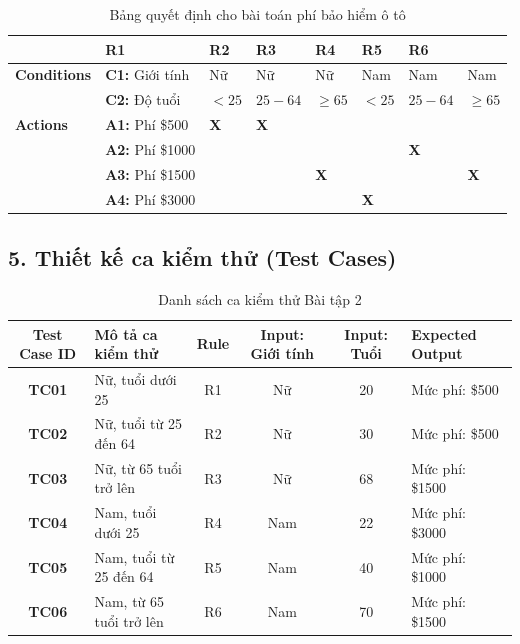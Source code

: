 \documentclass[11pt,a4paper]{article}
\begin{document}
\begin{table}[H]
\centering
\renewcommand{\arraystretch}{1.2}
\begin{tabularx}{\textwidth}{|l|l|Y|Y|Y|Y|Y|Y|}
\hline
{}
 & \textbf{R1} & \textbf{R2} & \textbf{R3} & \textbf{R4} & \textbf{R5} & \textbf{R6} \\ \hline
\textbf{Conditions} & \textbf{C1:} Giới tính & Nữ & Nữ & Nữ & Nam & Nam & Nam \\ 
 & \textbf{C2:} Độ tuổi & $< 25$ & $25 - 64$ & $\ge 65$ & $< 25$ & $25 - 64$ & $\ge 65$ \\ \hline
\textbf{Actions} & \textbf{A1:} Phí \$500 & \textbf{X} & \textbf{X} & & & & \\ 
 & \textbf{A2:} Phí \$1000 & & & & & \textbf{X} & \\ 
 & \textbf{A3:} Phí \$1500 & & & \textbf{X} & & & \textbf{X} \\ 
 & \textbf{A4:} Phí \$3000 & & & & \textbf{X} & & \\ \hline
\end{tabularx}
\caption*{Bảng quyết định cho bài toán phí bảo hiểm ô tô}
\end{table}

\subsection*{5. Thiết kế ca kiểm thử (Test Cases)}

\begin{table}[H]
\centering
\renewcommand{\arraystretch}{1.2}
\begin{tabularx}{\textwidth}{|c|L|c|c|c|L|}
\hline
{}
\textbf{Test Case ID} & \textbf{Mô tả ca kiểm thử} & \textbf{Rule} & \textbf{Input: Giới tính} & \textbf{Input: Tuổi} & \textbf{Expected Output} \\ \hline
\textbf{TC01} & Nữ, tuổi dưới 25 & R1 & Nữ & 20 & Mức phí: \$500 \\ \hline
\textbf{TC02} & Nữ, tuổi từ 25 đến 64 & R2 & Nữ & 30 & Mức phí: \$500 \\ \hline
\textbf{TC03} & Nữ, từ 65 tuổi trở lên & R3 & Nữ & 68 & Mức phí: \$1500 \\ \hline
\textbf{TC04} & Nam, tuổi dưới 25 & R4 & Nam & 22 & Mức phí: \$3000 \\ \hline
\textbf{TC05} & Nam, tuổi từ 25 đến 64 & R5 & Nam & 40 & Mức phí: \$1000 \\ \hline
\textbf{TC06} & Nam, từ 65 tuổi trở lên & R6 & Nam & 70 & Mức phí: \$1500 \\ \hline
\end{tabularx}
\caption*{Danh sách ca kiểm thử Bài tập 2}
\end{table}
\end{document}
